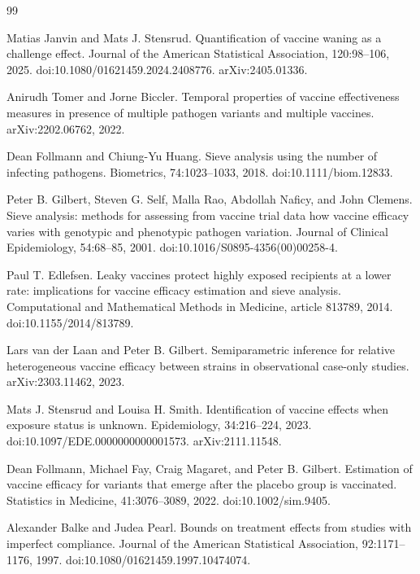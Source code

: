 \documentclass{article}
\begin{document}
\begin{thebibliography}{99}

   Matias Janvin and Mats J. Stensrud. Quantification of vaccine waning as a challenge effect. Journal of the American Statistical Association, 120:98--106, 2025. doi:10.1080/01621459.2024.2408776. arXiv:2405.01336.

   Anirudh Tomer and Jorne Biccler. Temporal properties of vaccine effectiveness measures in presence of multiple pathogen variants and multiple vaccines. arXiv:2202.06762, 2022.

   Dean Follmann and Chiung-Yu Huang. Sieve analysis using the number of infecting pathogens. Biometrics, 74:1023--1033, 2018. doi:10.1111/biom.12833.

   Peter B. Gilbert, Steven G. Self, Malla Rao, Abdollah Naficy, and John Clemens. Sieve analysis: methods for assessing from vaccine trial data how vaccine efficacy varies with genotypic and phenotypic pathogen variation. Journal of Clinical Epidemiology, 54:68--85, 2001. doi:10.1016/S0895-4356(00)00258-4.

   Paul T. Edlefsen. Leaky vaccines protect highly exposed recipients at a lower rate: implications for vaccine efficacy estimation and sieve analysis. Computational and Mathematical Methods in Medicine, article 813789, 2014. doi:10.1155/2014/813789.

   Lars van der Laan and Peter B. Gilbert. Semiparametric inference for relative heterogeneous vaccine efficacy between strains in observational case-only studies. arXiv:2303.11462, 2023.

   Mats J. Stensrud and Louisa H. Smith. Identification of vaccine effects when exposure status is unknown. Epidemiology, 34:216--224, 2023. doi:10.1097/EDE.0000000000001573. arXiv:2111.11548.

   Dean Follmann, Michael Fay, Craig Magaret, and Peter B. Gilbert. Estimation of vaccine efficacy for variants that emerge after the placebo group is vaccinated. Statistics in Medicine, 41:3076--3089, 2022. doi:10.1002/sim.9405.

   Alexander Balke and Judea Pearl. Bounds on treatment effects from studies with imperfect compliance. Journal of the American Statistical Association, 92:1171--1176, 1997. doi:10.1080/01621459.1997.10474074.


\end{thebibliography}
\end{document}
